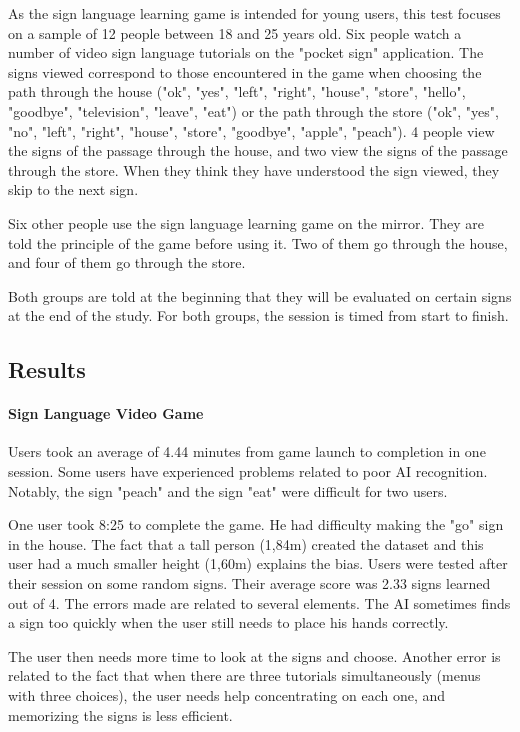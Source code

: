 As the sign language learning game is intended for young users, this test focuses on a sample of 12 people between 18 and 25 years old.
Six people watch a number of video sign language tutorials on the "pocket sign" application. The signs viewed correspond to those encountered in the game when choosing the path through the house ("ok", "yes", "left", "right", "house", "store", "hello", "goodbye", "television", "leave", "eat") or the path through the store ("ok", "yes", "no", "left", "right", "house", "store", "goodbye", "apple", "peach"). 4 people view the signs of the passage through the house, and two view the signs of the passage through the store.
When they think they have understood the sign viewed, they skip to the next sign. 

Six other people use the sign language learning game on the mirror. They are told the principle of the game before using it. Two of them go through the house, and four of them go through the store.

Both groups are told at the beginning that they will be evaluated on certain signs at the end of the study. 
For both groups, the session is timed from start to finish.
\subsection{Results}

\paragraph{Sign Language Video Game}

Users took an average of 4.44 minutes from game launch to completion in one session. Some users have experienced problems related to poor AI recognition.
Notably, the sign "peach" and the sign "eat" were difficult for two users.

One user took 8:25 to complete the game. He had difficulty making the "go" sign in the house. The fact that a tall person  (1,84m) created the dataset and this user had a much smaller height (1,60m) explains the bias. Users were tested after their session on some random signs. Their average score was 2.33 signs learned out of 4. The errors made are related to several elements. The AI sometimes finds a sign too quickly when the user still needs to place his hands correctly. 

The user then needs more time to look at the signs and choose. Another error is related to the fact that when there are three tutorials simultaneously (menus with three choices), the user needs help concentrating on each one, and memorizing the signs is less efficient.


